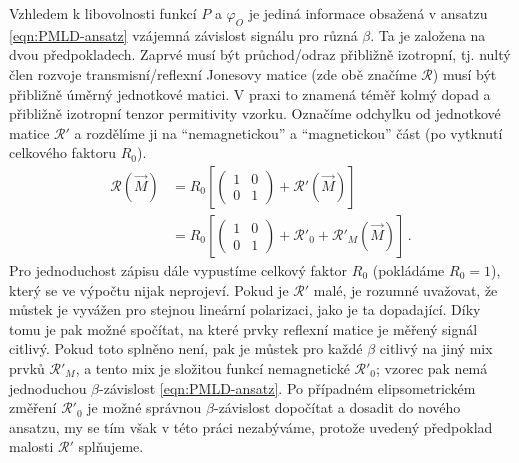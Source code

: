 Vzhledem k libovolnosti funkcí $P$ a $\varphi_O$ je jediná informace obsažená v ansatzu \eqref{eqn:PMLD-ansatz} vzájemná závislost signálu pro různá $\beta$.
Ta je založena na dvou předpokladech.
Zaprvé musí být průchod/odraz přibližně izotropní, tj. nultý člen rozvoje transmisní/reflexní Jonesovy matice (zde obě značíme $\mathcal{R}$) musí být přibližně úměrný jednotkové matici.
V praxi to znamená téměř kolmý dopad a přibližně izotropní tenzor permitivity vzorku.
Označíme odchylku od jednotkové matice $\mathcal{R}'$ a rozdělíme ji na ``nemagnetickou'' a ``magnetickou'' část (po vytknutí celkového faktoru $R_0$).
\begin{equation}
\label{eqn:PMLD-Jones}
\begin{split}
\mathcal{R}(\vec{M}) &= R_0 \left[ \begin{pmatrix} 1&0\\0&1 \end{pmatrix} + \mathcal{R}'(\vec{M}) \right] \\
                     &= R_0 \left[ \begin{pmatrix} 1&0\\0&1 \end{pmatrix} + \mathcal{R}'_0 + \mathcal{R}'_M(\vec{M}) \right] \,.
\end{split}
\end{equation}
Pro jednoduchost zápisu dále vypustíme celkový faktor $R_0$ (pokládáme $R_0=1$), který se ve výpočtu nijak neprojeví.
Pokud je $\mathcal{R}'$ malé, je rozumné uvažovat, že můstek je vyvážen pro stejnou lineární polarizaci, jako je ta dopadající.
Díky tomu je pak možné spočítat, na které prvky reflexní matice je měřený signál citlivý.
Pokud toto splněno není, pak je můstek pro každé $\beta$ citlivý na jiný mix prvků $\mathcal{R}'_M$, a tento mix je složitou funkcí nemagnetické $\mathcal{R}'_0$; vzorec pak nemá jednoduchou $\beta$-závislost \eqref{eqn:PMLD-ansatz}.
Po případném elipsometrickém změření $\mathcal{R}'_0$ je možné správnou $\beta$-závislost dopočítat a dosadit do nového ansatzu, my se tím však v této práci nezabýváme, protože uvedený předpoklad malosti $\mathcal{R}'$ splňujeme.

